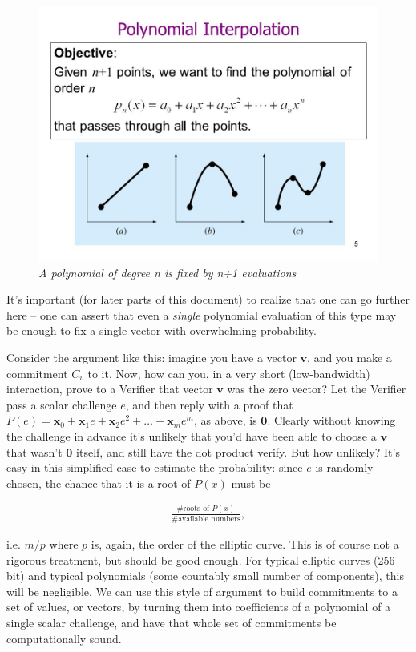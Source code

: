 \documentclass[10pt,a4paper]{article}
\begin{document}
\begin{figure}[h]
\centering
\includegraphics[scale=0.5]{images/PolynomialInterpolation.jpg}
\caption{\emph{A polynomial of degree n is fixed by n+1 evaluations}}
\end{figure}
It's important (for later parts of this document) to realize that one
can go further here -- one can assert that even a \emph{single}
polynomial evaluation of this type may be enough to fix a single vector
with overwhelming probability. 

Consider the argument like this: imagine
you have a vector $\mathbf{v}$, and you make a commitment $C_v$ to it. Now, how can you,
in a very short (low-bandwidth) interaction, prove to a Verifier that
vector $\mathbf{v}$ was the zero vector? Let the Verifier pass a scalar
challenge $e$, and then reply with a proof that $P(e) = \mathbf{x}_0 + \mathbf{x}_1e + \mathbf{x}_2e^2 + \ldots + \mathbf{x}_me^m$, as above, is $\mathbf{0}$. Clearly
without knowing the challenge in advance it's unlikely that you'd have
been able to choose a $\mathbf{v}$ that wasn't $\mathbf{0}$ itself, and still have the dot product
verify. But how unlikely? It's easy in this simplified case to estimate
the probability: since $e$ is randomly chosen, the chance that it is a root
of $P(x)$ must be

\begin{align*}
\frac{\text{\# roots of } P(x)}{\text{\# available numbers}},
\end{align*}

i.e. $m/p$ where $p$ is, again, the order of the elliptic curve. This is
of course not a rigorous treatment, but should be good enough. For
typical elliptic curves (256 bit) and typical polynomials (some
countably small number of components), this will be negligible. We can
use this style of argument to build commitments to a set of values, or
vectors, by turning them into coefficients of a polynomial of a single
scalar challenge, and have that whole set of commitments be
computationally sound.
\end{document}

